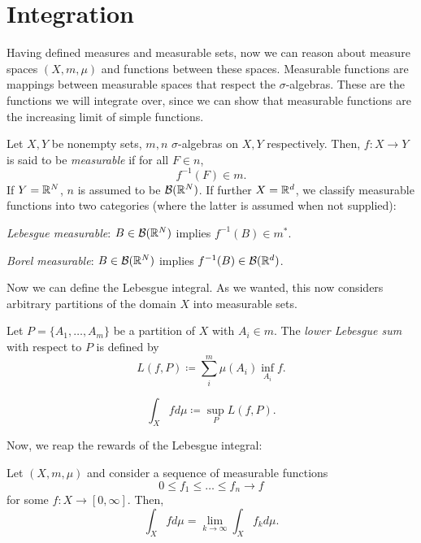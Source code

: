 \documentclass{article}
\begin{document}
\section{Integration}
Having defined measures and measurable sets, now we can reason about measure spaces $(X, m, \mu )$ and functions between these spaces. Measurable functions are mappings between measurable spaces that respect the $\sigma$-algebras. These are the functions we will integrate over, since we can show that measurable functions are the increasing limit of simple functions. 
\begin{defi}
    Let $X, Y$ be nonempty sets, $m, n$ $\sigma$-algebras on $X, Y$ respectively. Then, $f : X\to Y$ is said to be \emph{measurable} if for all $F \in n$,
    \[
        f^{-1} (F) \in m. 
    \]
    If $Y = \mathbb{R}^N $, $n$ is assumed to be $\mathcal{B} (\mathbb{R}^N )$. If further $X = \mathbb{R}^d $, we classify measurable functions into two categories (where the latter is assumed when not supplied): 
    \begin{enum}
        \item \emph{Lebesgue measurable}: $B \in \mathcal{B} (\mathbb{R}^N )$ implies $f^{-1} (B) \in m^*$. 
        \item \emph{Borel measurable}: $B \in \mathcal{B} (\mathbb{R}^N )$ implies $f^{-1} (B) \in \mathcal{B} (\mathbb{R}^d )$.  
    \end{enum}
\end{defi}

Now we can define the Lebesgue integral. As we wanted, this now considers arbitrary partitions of the domain $X$ into measurable sets. 
\begin{defi}
    Let $P = \{ A_1 , \dots, A_m  \} $ be a partition of $X$ with $A_i \in m$. The \emph{lower Lebesgue sum} with respect to $P$ is defined by 
   \[
       L(f, P) \coloneqq \sum_{i}^m  \mu (A_i ) \inf _{A_i } f.  
   \]
\end{defi}

\begin{defi}
   \[
       \int_X f d \mu \coloneqq \sup_P L(f, P)  . 
   \]
\end{defi}

Now, we reap the rewards of the Lebesgue integral:  
\begin{thm}
    Let $(X, m, \mu )$ and consider a sequence of measurable functions 
    \[
        0\leq  f_1  \leq  \dots \leq  f_n  \to f
    \]
    for some $f : X\to [0, \infty ]$. Then, 
    \[
        \int _X f d \mu = \lim_{k \to \infty} \int _X  f_k d \mu . 
    \]
\end{thm}
\end{document}
